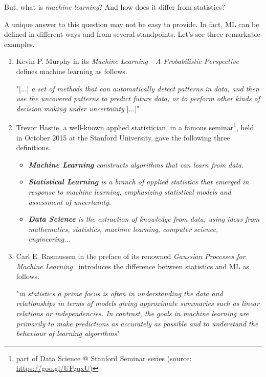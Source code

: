 But, what is \textit{machine learning}? And how does it differ from statistics?

A unique answer to this question may not be easy to provide. In fact, ML can be defined in different ways and from several standpoints. Let's see three remarkable examples.

\begin{enumerate}
  \item Kevin P. Murphy in its \emph{Machine Learning - A Probabilistic Perspective}~\cite{murphy2012machine} defines machine learning as follows.

  \begin{displayquote}
  "[...] \emph{a set of methods that can automatically detect patterns in data, and then use the uncovered patterns to predict future data, or to perform other kinds of decision making under uncertainty} [...]"
  \end{displayquote}

  \item Trevor Hastie, a well-known applied statistician, in a famous seminar\footnote{part of Data Science @ Stanford Seminar series (source: \url{https://goo.gl/UFgqxU})}, held in October 2015 at the Stanford University, gave the following three definitions.

  \begin{displayquote}
    \begin{itemize}
      \item[] \emph{{\bf Machine Learning} constructs algorithms that can learn from data.}
      \item[] \emph{{\bf Statistical Learning}  is a branch of applied statistics that emerged in response to machine learning, emphasizing statistical models and assessment of uncertainty.}
      \item[] \emph{{\bf Data Science}  is the extraction of knowledge from data, using ideas from mathematics, statistics, machine learning, computer science, engineering...}
    \end{itemize}
  \end{displayquote}

  \item Carl E. Rasmussen in the preface of its renowned \emph{Gaussian Processes for Machine Learning}~\cite{rasmussen2006gaussian} introduces the difference between statistics and ML as follows.

  \begin{displayquote}
    "\emph{in statistics a prime focus is often in understanding the data and relationships in terms of models giving approximate summaries such as linear relations or independencies. In contrast, the goals in machine learning are primarily to make predictions as accurately as possible and to understand the behaviour of learning algorithms}"
  \end{displayquote}

\end{enumerate}

